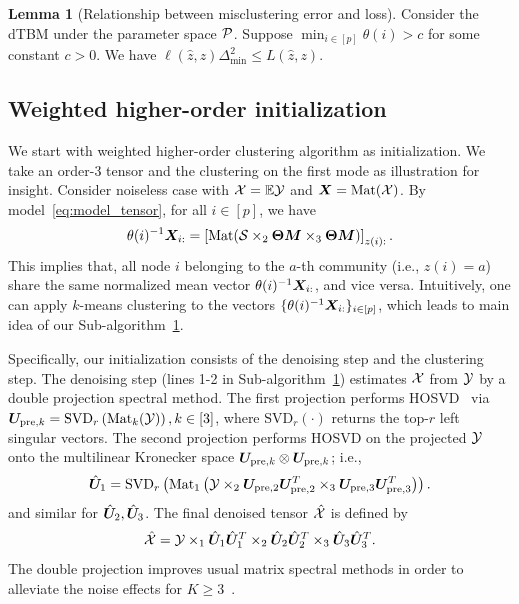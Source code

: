 \documentclass[journal]{IEEEtran}
\theoremstyle{definition}
\newtheorem{lem}{Lemma}
\theoremstyle{definition}
\newcommand{\of}[1]{\left(#1\right)}
\newcommand{\off}[1]{\left[#1\right]}
\def\fixme#1#2{\textbf{\color{red}[FIXME (#1): #2]}}
\begin{document}
\begin{lem}[Relationship between misclustering error and loss]\label{lem:mis} {Consider the dTBM under the parameter space $\mathcal{P}$.} Suppose $\min_{i \in [p]}\theta(i) > c$ for some constant $c > 0$. We have $\ell(\hat z, z) \Delta_{\min}^2 \leq L(\hat z, z)$.
\end{lem}

\subsection{Weighted higher-order initialization}

We start with weighted higher-order clustering algorithm as initialization.   {We take an order-3 tensor and the clustering on the first mode as illustration for insight.} Consider noiseless case with $\mathcal{X} = \mathbb{E}\mathcal{Y}$ and $\bm X = \text{Mat}(\mathcal{X})$. 
By model~\eqref{eq:model_tensor}, for all $i \in [p]$, we have
\begin{equation}\label{eq:kmeans}
    \theta(i)^{-1} \mX_{i:} = \off{\text{Mat}( \tS \times_2 \mTheta \mM \times_3  \mTheta \mM )}_{z(i):}. 
\end{equation}
This implies that, all node $i$ belonging to the $a$-th community (i.e., $z(i)=a$) share the same normalized mean vector $\theta(i)^{-1} \bm X_{i:}$, and vice versa. Intuitively, one can apply $k$-means clustering to the vectors $\{ \theta(i)^{-1} \bm X_{i:} \}_{i\in[p]}$, which leads to main idea of our Sub-algorithm~\hyperref[alg:main]{1}.  


Specifically, our initialization consists of the denoising step and the clustering step. The denoising step (lines 1-2 in Sub-algorithm~\hyperref[alg:main]{1}) estimates $\mathcal{X}$ from $\mathcal{Y}$ by a double projection spectral method.  
The first projection performs HOSVD~\citep{de2000multilinear} via $\mU_{\text{pre},k} = \text{SVD}_{r} \of{ \text{Mat}_k(\tY) }, k \in [3]$, where $\text{SVD}_r(\cdot)$ returns the top-$r$ left singular vectors. The second projection performs HOSVD on the projected $\mathcal{Y}$ onto the multilinear Kronecker space $\bm{U}_{\text{pre},k} \otimes  \bm{U}_{\text{pre},k}$; i.e.,
\begin{equation}\label{eq:two-step_factor}
    \hat \mU_1 = \text{SVD}_{r} \of{\text{Mat}_1\of{ \tY\times_2  \mU_{\text{pre},2} \mU_{\text{pre},2}^T \times_3   \mU_{\text{pre},3} \mU_{\text{pre},3}^T }}.
\end{equation}
and similar for $ \hat {\bm{U}}_2 ,  \hat {\bm{U}}_3 $.
The final denoised tensor $\hat {\mathcal{X}}$ is defined by
\begin{equation}\label{eq:two-step_est}
    \hat \tX = \tY \times_1 \hat \mU_1 \hat 
\mU^T_1 \times_2 \hat \mU_2 \hat \mU^T_2 \times_3 \hat \mU_3 \hat \mU^T_3. 
\end{equation}
The double projection improves usual matrix spectral methods in order to alleviate the noise effects for $K\geq 3$~\citep{han2020exact}.
\end{document}
